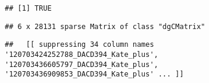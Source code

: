 \documentclass[
]{article}
\newenvironment{Shaded}{\begin{snugshade}}{\end{snugshade}}
\newcommand{\CommentTok}[1]{\textcolor[rgb]{0.56,0.35,0.01}{\textit{#1}}}
\newcommand{\FunctionTok}[1]{\textcolor[rgb]{0.13,0.29,0.53}{\textbf{#1}}}
\newcommand{\NormalTok}[1]{#1}
\newcommand{\SpecialCharTok}[1]{\textcolor[rgb]{0.81,0.36,0.00}{\textbf{#1}}}
\begin{document}
\begin{verbatim}
## [1] TRUE
\end{verbatim}

\begin{Shaded}
\end{Shaded}

\begin{verbatim}
## 6 x 28131 sparse Matrix of class "dgCMatrix"
\end{verbatim}

\begin{verbatim}
##   [[ suppressing 34 column names '120703424252788_DACD394_Kate_plus', '120703436605797_DACD394_Kate_plus', '120703436909853_DACD394_Kate_plus' ... ]]
\end{verbatim}
\end{document}
